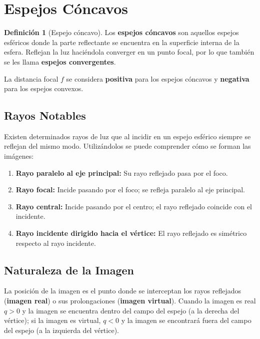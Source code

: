 \documentclass[12pt, a4paper]{article}
\theoremstyle{definition}
\newtheorem{definicion}{Definición}[section]
\begin{document}
\section{Espejos Cóncavos}

\begin{definicion}[Espejo cóncavo]
Los \textbf{espejos cóncavos} son aquellos espejos esféricos donde la parte reflectante se encuentra en la superficie interna de la esfera. Reflejan la luz haciéndola converger en un punto focal, por lo que también se les llama \textbf{espejos convergentes}.
\end{definicion}

La distancia focal \(f\) se considera \textbf{positiva} para los espejos cóncavos y \textbf{negativa} para los espejos convexos.

\subsection{Rayos Notables}

Existen determinados rayos de luz que al incidir en un espejo esférico siempre se reflejan del mismo modo. Utilizándolos se puede comprender cómo se forman las imágenes:

\begin{enumerate}
  \item \textbf{Rayo paralelo al eje principal:} Su rayo reflejado pasa por el foco.
  \item \textbf{Rayo focal:} Incide pasando por el foco; se refleja paralelo al eje principal.
  \item \textbf{Rayo central:} Incide pasando por el centro; el rayo reflejado coincide con el incidente.
  \item \textbf{Rayo incidente dirigido hacia el vértice:} El rayo reflejado es simétrico respecto al rayo incidente.
\end{enumerate}

\subsection{Naturaleza de la Imagen}

La posición de la imagen es el punto donde se interceptan los rayos reflejados (\textbf{imagen real}) o sus prolongaciones (\textbf{imagen virtual}). Cuando la imagen es real \(q > 0\) y la imagen se encuentra dentro del campo del espejo (a la derecha del vértice); si la imagen es virtual, \(q < 0\) y la imagen se encontrará fuera del campo del espejo (a la izquierda del vértice).
\end{document}
